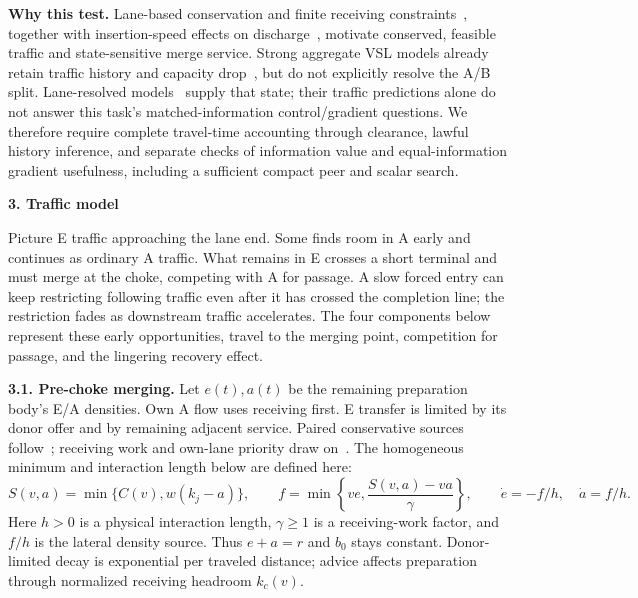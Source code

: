 \documentclass[10pt,a4paper]{article}
\newcommand{\head}[1]{\par\vspace{4pt}\noindent\textbf{#1}\par\nobreak\vspace{1pt}}
\begin{document}
\textbf{Why this test.} Lane-based conservation and finite receiving
constraints~\cite{subraveti,carey}, together with insertion-speed effects
on discharge~\cite{leclercq2011,leclercq}, motivate conserved, feasible
traffic and state-sensitive merge service. Strong aggregate VSL models
already retain traffic history and capacity drop~\cite{wei}, but do not
explicitly resolve the A/B split. Lane-resolved models~\cite{subraveti,carey}
supply that state; their traffic predictions alone do not answer this task's
matched-information control/gradient questions. We therefore require
complete travel-time accounting through clearance, lawful history inference,
and separate checks of information value and equal-information gradient
usefulness, including a sufficient compact peer and scalar search.

\newpage
\head{3. Traffic model}
Picture E traffic approaching the lane end. Some finds room in A early and
continues as ordinary A traffic. What remains in E crosses a short terminal
and must merge at the choke, competing with A for passage. A slow forced
entry can keep restricting following traffic even after it has crossed the
completion line; the restriction fades as downstream traffic accelerates.
The four components below represent these early opportunities, travel to
the merging point, competition for passage, and the lingering recovery effect.

\textbf{3.1. Pre-choke merging.}
Let $e(t),a(t)$ be the remaining preparation body's E/A densities.
Own A flow uses receiving first. E transfer is limited by its donor offer
and by remaining adjacent service.
Paired conservative sources follow~\cite{subraveti}; receiving work
and own-lane priority draw on~\cite{carey}. The homogeneous minimum and
interaction length below are defined here:
\begin{equation}
 S(v,a)=\min\{C(v),w(k_j-a)\},\qquad
 f=\min\!\left\{ve,\frac{S(v,a)-va}{\gamma}\right\},\qquad
 \dot e=-f/h,\quad \dot a=f/h.
 \label{eq:prep}
\end{equation}
Here $h>0$ is a physical interaction length, $\gamma\geq1$ is a receiving-work
factor, and $f/h$ is the lateral density source. Thus $e+a=r$ and $b_0$
stays constant. Donor-limited decay is exponential per traveled distance;
advice affects preparation through normalized receiving headroom $k_c(v)$.
\end{document}

